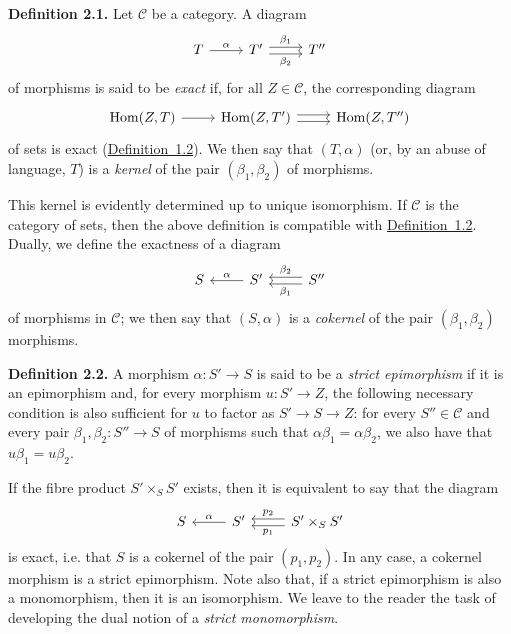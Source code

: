 \documentclass{article}
\newenvironment{rmenv}[1]
  {\phantomsection\par\medskip\noindent\textbf{#1.}\rmfamily}
  {\medskip}
\renewcommand{\cal}[1]{{\mathcal{#1}}}
\DeclareMathOperator{\Hom}{Hom}
\newcommand{\oldpage}[1]{\marginpar{\footnotesize$\Big\vert$ \textit{p.~#1}}}
\begin{document}
\subsection{}
\label{A.2.a}

\begin{rmenv}{Definition 2.1}
\label{definition:A.2.1}
  Let $\cal{C}$ be a category.
  A diagram
  \[
    \begin{tikzcd}
      T \rar["\alpha"]
      & T' \rar[shift left=1,"\beta_1"] \rar[shift right=1,swap,"\beta_2"]
      & T''
    \end{tikzcd}
  \]
  of morphisms is said to be \emph{exact} if, for all $Z\in\cal{C}$, the corresponding diagram
  \[
    \begin{tikzcd}
      \Hom(Z,T) \rar
      & \Hom(Z,T') \rar[shift left=1] \rar[shift right=1]
      & \Hom(Z,T'')
    \end{tikzcd}
  \]
  of sets is exact (\hyperref[definition:A.1.2]{Definition~1.2}).
  We then say that $(T,\alpha)$ (or, by an abuse of language, $T$) is a \emph{kernel} of the pair $(\beta_1,\beta_2)$ of morphisms.
\end{rmenv}

This kernel is evidently determined up to unique isomorphism.
If $\cal{C}$ is the category of sets, then the above definition is compatible with \hyperref[definition:A.1.2]{Definition~1.2}.
Dually, we define the exactness of a diagram
\[
  \begin{tikzcd}
    S
    & S' \lar[swap,"\alpha"]
    & S''\lar[shift left=1,"\beta_1"] \lar[shift right=1,swap,"\beta_2"]
  \end{tikzcd}
\]
of morphisms in $\cal{C}$;
we then say that $(S,\alpha)$ is a \emph{cokernel} of the pair $(\beta_1,\beta_2)$ morphisms.

\begin{rmenv}{Definition 2.2}
\label{definition:A.2.2}
  A morphism $\alpha\colon S'\to S$ is said to be a \emph{strict epimorphism} if it is an epimorphism and, for every morphism $u\colon S'\to Z$, the following necessary condition is also sufficient for $u$ to factor as $S'\to S\to Z$:
  for every $S''\in\cal{C}$ and every pair $\beta_1,\beta_2\colon S''\to S$ of morphisms such that $\alpha\beta_1=\alpha\beta_2$, we also have that $u\beta_1=u\beta_2$.
\end{rmenv}

If the fibre product $S'\times_S S'$ exists, then it is equivalent to say that the diagram
\[
  \begin{tikzcd}
    S
    & S' \lar[swap,"\alpha"]
    & S'\times_S S'\lar[shift left=1,"p_1"] \lar[shift right=1,swap,"p_2"]
  \end{tikzcd}
\]
\oldpage{190-07}
is exact, i.e. that $S$ is a cokernel of the pair $(p_1,p_2)$.
In any case, a cokernel morphism is a strict epimorphism.
Note also that, if a strict epimorphism is also a monomorphism, then it is an isomorphism.
We leave to the reader the task of developing the dual notion of a \emph{strict monomorphism}.
\end{document}
